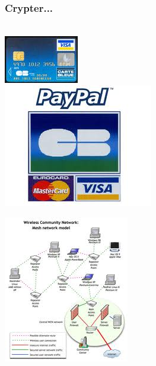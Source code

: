 \documentclass[slideopt,A4]{beamer}
\begin{document}
%
\begin{frame}
\frametitle{Crypter...}
%
% 
\begin{minipage}{5cm}
~\\[-50mm]
\includegraphics[width=0.75\linewidth]{carte-bleue.jpg}\\
\includegraphics[width=0.95\linewidth]{paypal.jpg}
\end{minipage}
\includegraphics[width=0.5\linewidth]{reseau}
%
\end{frame}
%
\end{document}
